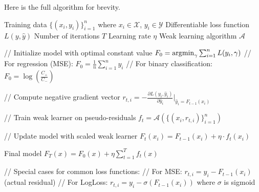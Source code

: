         \begin{algo}
          Here is the full algorithm for brevity. 
          \begin{algorithm}[H]
            \label{alg:gradboost}
            \begin{algorithmic}[1]
              \Require Training data $\{(x_i, y_i)\}_{i=1}^n$ where $x_i \in \mathcal{X}$, $y_i \in \mathcal{Y}$
              \Require Differentiable loss function $L(y, \hat{y})$
              \Require Number of iterations $T$
              \Require Learning rate $\eta$
              \Require Weak learning algorithm $\mathcal{A}$

              \State // Initialize model with optimal constant value
              \State $F_0 = \argmin_\gamma \sum_{i=1}^n L(y_i, \gamma)$
              \State // For regression (MSE): $F_0 = \frac{1}{n}\sum_{i=1}^n y_i$
              \State // For binary classification: $F_0 = \log(\frac{C_+}{C_-})$

                  \State // Compute negative gradient vector
                      \State $r_{t,i} = -\frac{\partial L(y_i, \hat{y}_i)}{\partial \hat{y}_i}\big|_{\hat{y}_i = F_{t-1}(x_i)}$
                  \EndFor
                  
                  \State // Train weak learner on pseudo-residuals
                  \State $f_t = \mathcal{A}(\{(x_i, r_{t,i})\}_{i=1}^n)$
                  
                  \State // Update model with scaled weak learner
                      \State $F_t(x_i) = F_{t-1}(x_i) + \eta \cdot f_t(x_i)$
                  \EndFor
              \EndFor

              \State \Return Final model $F_T(x) = F_0(x) + \eta \sum_{t=1}^T f_t(x)$

              \State // Special cases for common loss functions:
              \State // For MSE: $r_{t,i} = y_i - F_{t-1}(x_i)$ (actual residual)
              \State // For LogLoss: $r_{t,i} = y_i - \sigma(F_{t-1}(x_i))$ where $\sigma$ is sigmoid
            \end{algorithmic}
          \end{algorithm}
        \end{algo}

